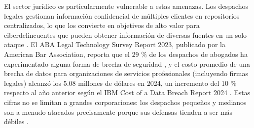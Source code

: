 El sector jurídico es particularmente vulnerable a estas amenazas. Los despachos legales gestionan información confidencial de múltiples clientes en repositorios centralizados, lo que los convierte en objetivos de alto valor para ciberdelincuentes que pueden obtener información de diversas fuentes en un solo ataque \cite{lexlatin2023}. El ABA Legal Technology Survey Report 2023, publicado por la American Bar Association, reporta que el 29 \% de los despachos de abogados ha experimentado alguna forma de brecha de seguridad \cite{aba2023}, y el costo promedio de una brecha de datos para organizaciones de servicios profesionales (incluyendo firmas legales) alcanzó los 5.08 millones de dólares en 2024, un incremento del 10 \% respecto al año anterior según el IBM Cost of a Data Breach Report 2024 \cite{ibm2024}. Estas cifras no se limitan a grandes corporaciones: los despachos pequeños y medianos son a menudo atacados precisamente porque sus defensas tienden a ser más débiles \cite{enthec2025}.

